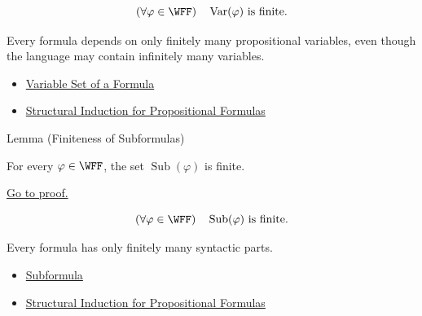 \begin{remark*}
\[
(\forall\varphi\in\WFF)\quad
\operatorname{Var}(\varphi)\text{ is finite}.
\]
\end{remark*}

\begin{remark*}[Interpretation]
Every formula depends on only finitely many propositional variables, even though the language may contain infinitely many variables.
\end{remark*}

\begin{dependencies}
\begin{itemize}
  \item \hyperref[def:formula-variable-set-propositional-logic]{Variable Set of a Formula}
  \item \hyperref[thm:structural-induction-propositional-formulas]{Structural Induction for Propositional Formulas}
\end{itemize}
\end{dependencies}
\begin{lemmabox}{Lemma (Finiteness of Subformulas)}
\begin{lemma}
\label{lem:finiteness-of-subformulas-propositional-formulas}
For every \(\varphi\in\WFF\), the set \(\operatorname{Sub}(\varphi)\) is finite.

\noindent\hyperref[prf:finiteness-of-subformulas-propositional-formulas]{Go to proof.}
\end{lemma}
\end{lemmabox}

\begin{remark*}
\[
(\forall\varphi\in\WFF)\quad
\operatorname{Sub}(\varphi)\text{ is finite}.
\]
\end{remark*}

\begin{remark*}[Interpretation]
Every formula has only finitely many syntactic parts.
\end{remark*}

\begin{dependencies}
\begin{itemize}
  \item \hyperref[def:subformula-propositional-logic]{Subformula}
  \item \hyperref[thm:structural-induction-propositional-formulas]{Structural Induction for Propositional Formulas}
\end{itemize}
\end{dependencies}

